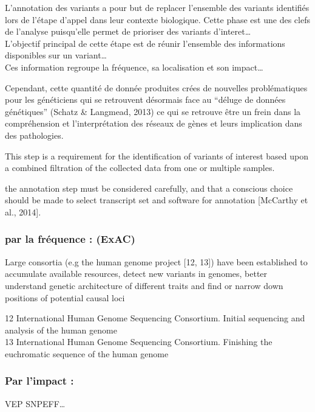 \documentclass[12pt,twoside]{reedthesis}
\theoremstyle{definition}
\theoremstyle{definition}
\theoremstyle{remark}
\begin{document}
  L'annotation des variants a pour but de replacer l'ensemble des variants
  identifiés lors de l'étape d'appel dans leur contexte biologique. Cette
  phase est une des clefs de l'analyse puisqu'elle permet de prioriser des
  variants d'interet\ldots{}\\
  L'objectif principal de cette étape est de réunir l'ensemble des
  informations disponibles sur un variant\ldots{}\\
  Ces information regroupe la fréquence, sa localisation et son
  impact\ldots{}
  
  Cependant, cette quantité de donnée produites crées de nouvelles
  problématiques pour les généticiens qui se retrouvent désormais face au
  ``déluge de données génétiques'' (Schatz \& Langmead, 2013) ce qui se
  retrouve être un frein dans la compréhension et l'interprétation des
  réseaux de gènes et leurs implication dans des pathologies.
  
  This step is a requirement for the identification of variants of
  interest based upon a combined filtration of the collected data from one
  or multiple samples.
  
  the annotation step must be considered carefully, and that a conscious
  choice should be made to select transcript set and software for
  annotation {[}McCarthy et al., 2014{]}.
  
  \subsubsection{par la fréquence : (ExAC)}\label{par-la-frequence-exac}
  
  Large consortia (e.g the human genome project {[}12, 13{]}) have been
  established to accumulate available resources, detect new variants in
  genomes, better understand genetic architecture of different traits and
  find or narrow down positions of potential causal loci
  
  12 International Human Genome Sequencing Consortium. Initial sequencing
  and analysis of the human genome\\
  13 International Human Genome Sequencing Consortium. Finishing the
  euchromatic sequence of the human genome
  
  \subsubsection{Par l'impact :}\label{par-limpact}
  
  VEP SNPEFF\ldots{}
  
\end{document}
